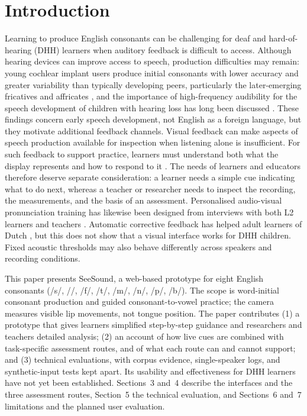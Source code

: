 \documentclass[engproc,article,submit,moreauthors]{Definitions/mdpi}
\newcommand{\ipa}[1]{/#1/}
\begin{document}
\section{Introduction}
Learning to produce English consonants can be challenging for deaf and hard-of-hearing (DHH) learners when auditory feedback is difficult to access. Although hearing devices can improve access to speech, production difficulties may remain: young cochlear implant users produce initial consonants with lower accuracy and greater variability than typically developing peers, particularly the later-emerging fricatives and affricates \cite{ertmer2011}, and the importance of high-frequency audibility for the speech development of children with hearing loss has long been discussed \cite{stelmachowicz2004}. These findings concern early speech development, not English as a foreign language, but they motivate additional feedback channels. Visual feedback can make aspects of speech production available for inspection when listening alone is insufficient. For such feedback to support practice, learners must understand both what the display represents and how to respond to it \cite{hitchcock2023}. The needs of learners and educators therefore deserve separate consideration: a learner needs a simple cue indicating what to do next, whereas a teacher or researcher needs to inspect the recording, the measurements, and the basis of an assessment. Personalised audio-visual pronunciation training has likewise been designed from interviews with both L2 learners and teachers \cite{bu2021}. Automatic corrective feedback has helped adult learners of Dutch \cite{neri2006}, but this does not show that a visual interface works for DHH children. Fixed acoustic thresholds may also behave differently across speakers and recording conditions.

This paper presents SeeSound, a web-based prototype for eight English consonants (\ipa{s}, \ipa{\textesh}, \ipa{f}, \ipa{t\textesh}, \ipa{m}, \ipa{n}, \ipa{p}, \ipa{b}). The scope is word-initial consonant production and guided consonant-to-vowel practice; the camera measures visible lip movements, not tongue position. The paper contributes (1) a prototype that gives learners simplified step-by-step guidance and researchers and teachers detailed analysis; (2) an account of how live cues are combined with task-specific assessment routes, and of what each route can and cannot support; and (3) technical evaluations, with corpus evidence, single-speaker logs, and synthetic-input tests kept apart. Its usability and effectiveness for DHH learners have not yet been established. Sections~3 and~4 describe the interfaces and the three assessment routes, Section~5 the technical evaluation, and Sections~6 and~7 limitations and the planned user evaluation.
\end{document}
